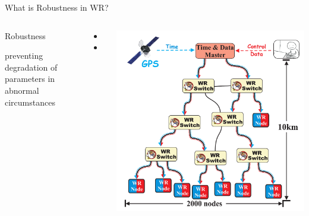 \documentclass[compress,red]{beamer}
\begin{document}
\begin{frame}{What is Robustness in WR?}
\begin{columns}[c]

    \begin{block}{\center Robustness}
      \begin{center}
	preventing degradation of parameters in abnormal circumstances
      \end{center}
    \end{block}

  \vspace{0.2cm}

  \begin{itemize}
    \item \color{blue!90}{Sub-nanosecond time synchronization}
    \item \color{red}{Deterministic Control Data delivery}
  \end{itemize}

    \begin{center}
    \includegraphics[height=1.0\textwidth]{network/wr_network-new.pdf}
    \end{center}
\end{columns}
\end{frame}
\end{document}
